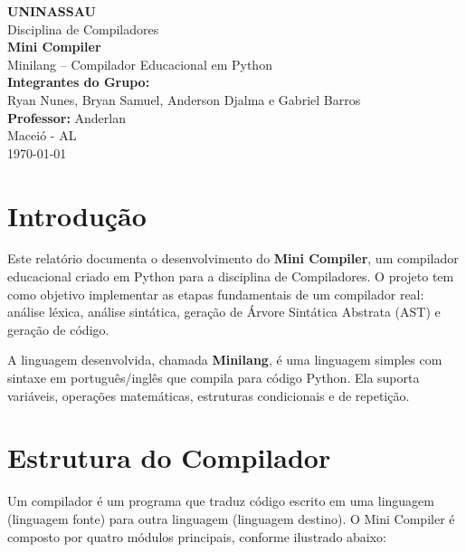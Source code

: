 \documentclass[12pt, a4paper]{article}
\begin{document}
\begin{titlepage}
    \centering
    \vspace*{2cm}
    {\large \textbf{UNINASSAU}}\\[0.5cm]
    {\large Disciplina de Compiladores}\\[3cm]

    {\Huge \textbf{Mini Compiler}}\\[0.5cm]
    {\Large Minilang -- Compilador Educacional em Python}\\[3cm]

    {\large \textbf{Integrantes do Grupo:}}\\[0.3cm]
    {\large Ryan Nunes, Bryan Samuel, Anderson Djalma e Gabriel Barros}\\[1cm]

    {\large \textbf{Professor:} Anderlan}\\[1cm]
    {\large Maceió - AL}\\[0.3cm]
    {\large \today}
\end{titlepage}

\tableofcontents
\newpage

\section{Introdução}

Este relatório documenta o desenvolvimento do \textbf{Mini Compiler}, um compilador educacional
criado em Python para a disciplina de Compiladores. O projeto tem como objetivo implementar
as etapas fundamentais de um compilador real: análise léxica, análise sintática, geração de
Árvore Sintática Abstrata (AST) e geração de código.

A linguagem desenvolvida, chamada \textbf{Minilang}, é uma linguagem simples com sintaxe
em português/inglês que compila para código Python. Ela suporta variáveis, operações
matemáticas, estruturas condicionais e de repetição.

\section{Estrutura do Compilador}

Um compilador é um programa que traduz código escrito em uma linguagem (linguagem fonte)
para outra linguagem (linguagem destino). O Mini Compiler é composto por quatro módulos
principais, conforme ilustrado abaixo:
\end{document}
